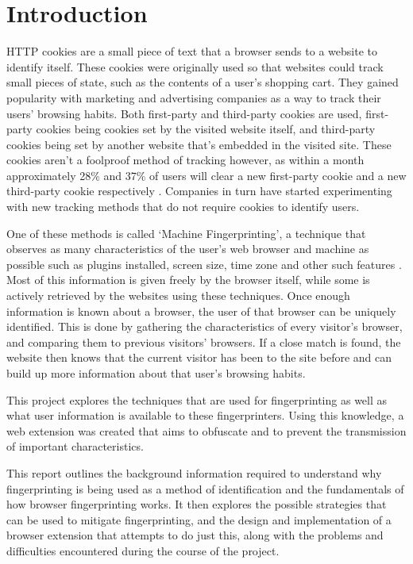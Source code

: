 \chapter{Introduction}

HTTP cookies are a small piece of text that a browser sends to a website to identify itself. These cookies were originally used so that websites could track small pieces of state, such as the contents of a user's shopping cart.
They gained popularity with marketing and advertising companies as a way to track their users' browsing habits.
Both first-party and third-party cookies are used, first-party cookies being cookies set by the visited website itself, and third-party cookies being set by another website that's embedded in the visited site.
These cookies aren't a foolproof method of tracking however, as within a month approximately 28\% and 37\% of users will clear a new first-party cookie and a new third-party cookie respectively \citep{comScore-cookies}.
Companies in turn have started experimenting with new tracking methods that do not require cookies to identify users.

One of these methods is called `Machine Fingerprinting', a technique that observes as many characteristics of the user's web browser and machine as possible such as plugins installed, screen size, time zone and other such features \citep{audio-fingerprint}.
Most of this information is given freely by the browser itself, while some is actively retrieved by the websites using these techniques.
Once enough information is known about a browser, the user of that browser can be uniquely identified.
This is done by gathering the characteristics of every visitor's browser, and comparing them to previous visitors' browsers.
If a close match is found, the website then knows that the current visitor has been to the site before and can build up more information about that user's browsing habits.

This project explores the techniques that are used for fingerprinting as well as what user information is available to these fingerprinters. Using this knowledge, a web extension was created that aims to obfuscate and to prevent the transmission of important characteristics.

This report outlines the background information required to understand why fingerprinting is being used as a method of identification and the fundamentals of how browser fingerprinting works.
It then explores the possible strategies that can be used to mitigate fingerprinting, and the design and implementation of a browser extension that attempts to do just this, along with the problems and difficulties encountered during the course of the project.

